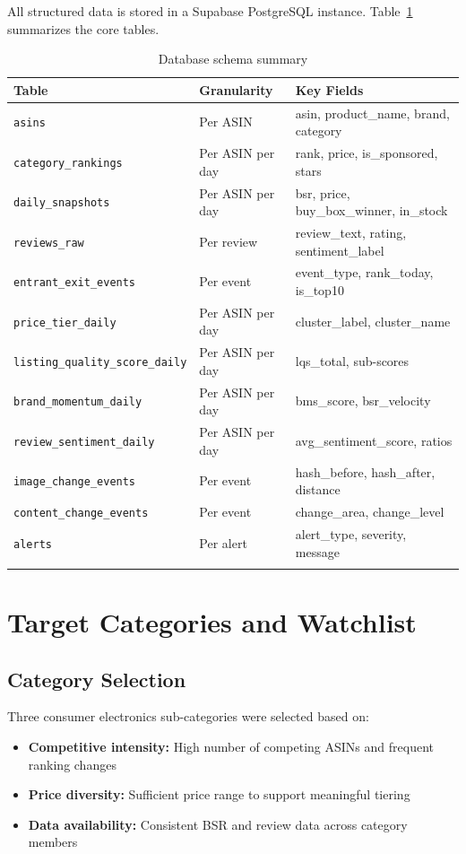 All structured data is stored in a Supabase PostgreSQL instance. Table~\ref{tab:schema}
summarizes the core tables.

\begin{longtable}{lll}
  \toprule
  \textbf{Table} & \textbf{Granularity} & \textbf{Key Fields} \\
  \midrule
  \endhead
  \texttt{asins} & Per ASIN & asin, product\_name, brand, category \\
  \texttt{category\_rankings} & Per ASIN per day & rank, price, is\_sponsored, stars \\
  \texttt{daily\_snapshots} & Per ASIN per day & bsr, price, buy\_box\_winner, in\_stock \\
  \texttt{reviews\_raw} & Per review & review\_text, rating, sentiment\_label \\
  \texttt{entrant\_exit\_events} & Per event & event\_type, rank\_today, is\_top10 \\
  \texttt{price\_tier\_daily} & Per ASIN per day & cluster\_label, cluster\_name \\
  \texttt{listing\_quality\_score\_daily} & Per ASIN per day & lqs\_total, sub-scores \\
  \texttt{brand\_momentum\_daily} & Per ASIN per day & bms\_score, bsr\_velocity \\
  \texttt{review\_sentiment\_daily} & Per ASIN per day & avg\_sentiment\_score, ratios \\
  \texttt{image\_change\_events} & Per event & hash\_before, hash\_after, distance \\
  \texttt{content\_change\_events} & Per event & change\_area, change\_level \\
  \texttt{alerts} & Per alert & alert\_type, severity, message \\
  \bottomrule
  \caption{Database schema summary}
  \label{tab:schema}
\end{longtable}

\section{Target Categories and Watchlist}

\subsection{Category Selection}
Three consumer electronics sub-categories were selected based on:
\begin{itemize}
  \item \textbf{Competitive intensity:} High number of competing ASINs and frequent ranking changes
  \item \textbf{Price diversity:} Sufficient price range to support meaningful tiering
  \item \textbf{Data availability:} Consistent BSR and review data across category members
\end{itemize}

